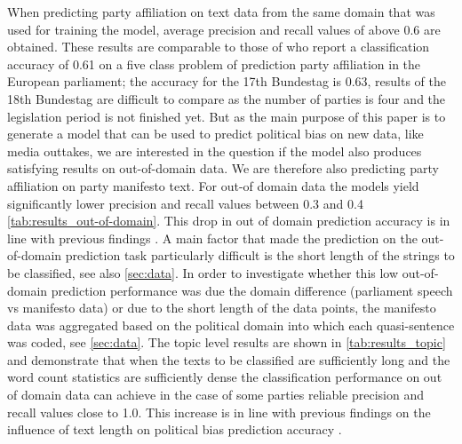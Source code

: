 \documentclass{article}
\begin{document}
When predicting party affiliation on text data from the same domain that was used for training the model, average precision and recall values of above 0.6 are obtained. These results are comparable to those of \cite{Hirst2014} who report a classification accuracy of 0.61 on a five class problem of prediction party affiliation in the European parliament; the accuracy for the 17th Bundestag is 0.63, results of the 18th Bundestag are difficult to compare as the number of parties is four and the legislation period is not finished yet.
But as the main purpose of this paper is to generate a model that can be used to predict political bias on new data, like media outtakes, we are interested in the question if the model also produces satisfying results on out-of-domain data. We are therefore also predicting party affiliation on party manifesto text. For out-of domain data the models yield significantly lower precision and recall values between 0.3 and 0.4 \autoref{tab:results_out-of-domain}. This drop in out of domain prediction accuracy is in line with previous findings \cite{Yu2008}.
A main factor that made the prediction on the out-of-domain prediction task particularly difficult is the short length of the strings to be classified, see also \autoref{sec:data}. In order to investigate whether this low out-of-domain prediction performance was due the domain difference (parliament speech vs manifesto data) or due to the short length of the data points, the manifesto data was aggregated based on the political domain into which each quasi-sentence was coded, see \autoref{sec:data}. The topic level results are shown in \autoref{tab:results_topic} and demonstrate that when the texts to be classified are sufficiently long and the word count statistics are sufficiently dense the classification performance on out of domain data can achieve in the case of some parties reliable precision and recall values close to 1.0. This increase is in line with previous findings on the influence of text length on political bias prediction accuracy \cite{Hirst2014}.
\end{document}
